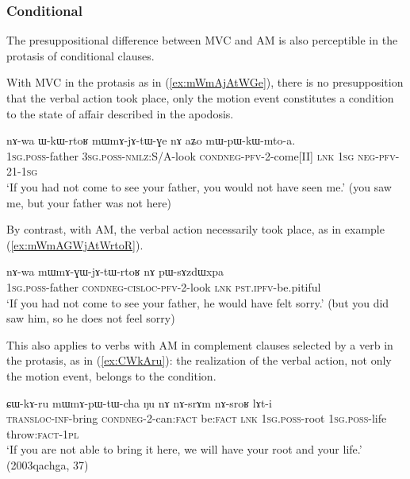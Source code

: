 \subsubsection{Conditional} \label{sec:am.conditional}
The presuppositional difference between MVC and AM is also perceptible in the protasis of conditional clauses. 

With MVC in the protasis as in (\ref{ex:mWmAjAtWGe}), there is no presupposition that the verbal action took place, only the motion event constitutes a condition to the state of affair described in the apodosis.

\begin{exe}
\ex \label{ex:mWmAjAtWGe}
\gll nɤ-wa ɯ-kɯ-rtoʁ mɯ\redp{}mɤ-jɤ-tɯ-ɣe nɤ aʑo mɯ-pɯ-kɯ-mto-a. \\
\textsc{1sg.poss}-father \textsc{3sg.poss-}\textsc{nmlz}:S/A-look \textsc{cond}\redp{}\textsc{neg}-\textsc{pfv}-2-come[II] \textsc{lnk} \textsc{1sg} \textsc{neg}-\textsc{pfv}-2\fl{}1-\textsc{1sg} \\
\glt `If you had not come to see your father, you would not have seen me.' (you saw me, but your father was not here)
\end{exe}

By contrast, with AM, the verbal action necessarily took place, as in example (\ref{ex:mWmAGWjAtWrtoR}).

\begin{exe}
\ex \label{ex:mWmAGWjAtWrtoR}
\gll nɤ-wa  mɯ\redp{}mɤ-ɣɯ-jɤ-tɯ-rtoʁ nɤ pɯ-sɤzdɯxpa \\
\textsc{1sg.poss}-father \textsc{cond}\redp{}\textsc{neg}-\textsc{cisloc}-\textsc{pfv}-2-look \textsc{lnk} \textsc{pst.ipfv}-be.pitiful \\ 
\glt `If you had not come to see your father, he would have felt sorry.' (but you did saw him, so he does not feel sorry)
\end{exe}

This also applies to verbs with AM in complement clauses selected by a verb in the protasis, as in (\ref{ex:CWkAru}): the realization of the verbal action, not only the motion event, belongs to the condition.

\begin{exe}
\ex \label{ex:CWkAru}
\gll ɕɯ-kɤ-ru mɯ\redp{}mɤ-pɯ-tɯ-cha ŋu nɤ nɤ-srɤm nɤ-sroʁ lɤt-i \\
\textsc{transloc}-\textsc{inf}-bring \textsc{cond}\redp{}\textsc{neg}-2-can:\textsc{fact} be:\textsc{fact} \textsc{lnk} \textsc{1sg.poss}-root \textsc{1sg.poss}-life throw:\textsc{fact}-\textsc{1pl} \\ 
\glt `If you are not able to bring it here, we will have your root and your life.' (2003qachga, 37)
\end{exe}
